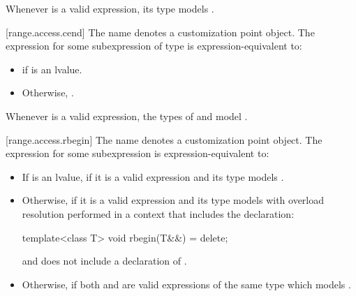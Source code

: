 \begin{addedblock}
\pnum
\begin{note}
Whenever  is a valid expression, its type models
.
\end{note}

[range.access.cend]{}
\pnum
The name  denotes a customization point
object. The expression
 for some subexpression  of type 
is expression-equivalent to:

\begin{itemize}
\item {} if  is an lvalue.
\item Otherwise, .
\end{itemize}

\pnum
\begin{note}
Whenever  is a valid expression, the
types  of  and  model
.
\end{note}

[range.access.rbegin]{}
\pnum
The name  denotes a customization point
object. The expression
 for some subexpression  is
expression-equivalent to:

\begin{itemize}
\item
  If  is an lvalue, 
  if it is a valid expression and its type  models .

\item
  Otherwise,  if it is a valid
  expression and its type  models  with overload
  resolution performed in a context that includes the declaration:
  \begin{codeblock}
  template<class T> void rbegin(T&&) = delete;
  \end{codeblock}
  and does not include a declaration of .

\item
  Otherwise,  if both
   and  are valid
  expressions of the same type  which models
  .


\end{itemize}
\end{addedblock}
